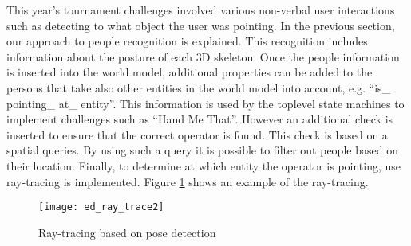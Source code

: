 This year’s tournament challenges involved various non-verbal user interactions such as detecting to what object the user was pointing. In the previous section, our approach to people recognition is explained. This recognition includes information about the posture of each 3D skeleton. Once the people information is inserted into the world model, additional properties can be added to the persons that take also other entities in the world model into account, e.g. “is\_ pointing\_ at\_ entity”. This information is used by the toplevel state machines to implement challenges such as “Hand Me That”. However an additional check is inserted to ensure that the correct operator is  found. This check is based on a spatial queries. By using such a query it is possible to filter out people based on their location. Finally, to determine at which entity the operator is pointing, use ray-tracing is implemented. Figure \ref{fig:ray_trace} shows an example of the ray-tracing.

\begin{figure}[H]
	\centering
    \texttt{[image: ed\_ray\_trace2]}
	\caption{Ray-tracing based on pose detection}
	\label{fig:ray_trace}
\end{figure}


